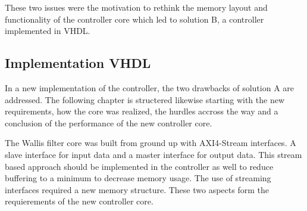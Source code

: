 \vspace{1ex}
These two issues were the motivation to rethink the memory layout and
functionality of the controller core which led to solution B, a controller
implemented in VHDL.




\subsection{Implementation VHDL} \label{ch:controller:vhdl}
In a new implementation of the controller, the two drawbacks of solution A are
addressed. The following chapter is structered likewise starting with the new
requirements, how the core was realized, the hurdles accross the way and a
conclusion of the performance of the new controller core.

The Wallis filter core was built from ground up with AXI4-Stream interfaces. A
slave interface for input data and a master interface for output data. This
stream based approach should be implemented in the controller as well to reduce
buffering to a minimum to decrease memory usage. The use of streaming interfaces
required a new memory structure. These two aspects form the requierements of the
new controller core.

